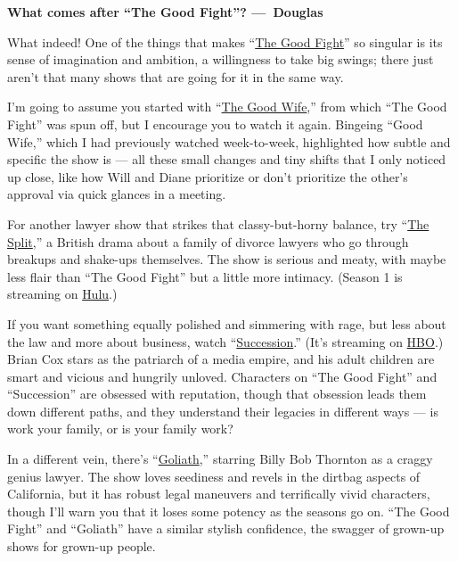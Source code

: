 \textbf{What comes after ``The Good Fight''? ---~Douglas}

What indeed! One of the things that makes
``\href{https://www.nytimes.com/watching/recommendations/the-good-wifehttps://www.nytimes.com/column/the-good-fight-tv-recaps}{The
Good Fight}'' so singular is its sense of imagination and ambition, a
willingness to take big swings; there just aren't that many shows that
are going for it in the same way.

I'm going to assume you started with
``\href{https://www.nytimes.com/watching/recommendations/the-good-wife}{The
Good Wife},'' from which ``The Good Fight'' was spun off, but I
encourage you to watch it again. Bingeing ``Good Wife,'' which I had
previously watched week-to-week, highlighted how subtle and specific the
show is --- all these small changes and tiny shifts that I only noticed
up close, like how Will and Diane prioritize or don't prioritize the
other's approval via quick glances in a meeting.

For another lawyer show that strikes that classy-but-horny balance, try
``\href{https://www.nytimes.com/watching/titles/the-split}{The Split},''
a British drama about a family of divorce lawyers who go through
breakups and shake-ups themselves. The show is serious and meaty, with
maybe less flair than ``The Good Fight'' but a little more intimacy.
(Season 1 is streaming on
\href{https://www.hulu.com/series/the-split-5d1de53d-d263-48b9-b44c-75410ef9b9f4}{Hulu}.)

If you want something equally polished and simmering with rage, but less
about the law and more about business, watch
``\href{https://www.nytimes.com/spotlight/succession}{Succession}.''
(It's streaming on \href{https://www.hbo.com/succession}{HBO}.) Brian
Cox stars as the patriarch of a media empire, and his adult children are
smart and vicious and hungrily unloved. Characters on ``The Good Fight''
and ``Succession'' are obsessed with reputation, though that obsession
leads them down different paths, and they understand their legacies in
different ways --- is work your family, or is your family work?

In a different vein, there's
``\href{https://www.nytimes.com/2016/10/14/arts/television/review-in-goliath-billy-bob-thornton-plays-a-down-and-out-david.html}{Goliath},''
starring Billy Bob Thornton as a craggy genius lawyer. The show loves
seediness and revels in the dirtbag aspects of California, but it has
robust legal maneuvers and terrifically vivid characters, though I'll
warn you that it loses some potency as the seasons go on. ``The Good
Fight'' and ``Goliath'' have a similar stylish confidence, the swagger
of grown-up shows for grown-up people.

